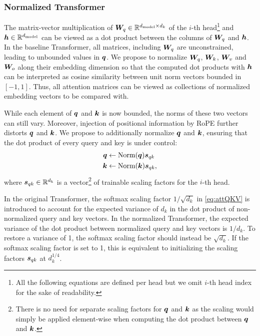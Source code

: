 \documentclass{article} %
\begin{document}
\subsubsection{Normalized Transformer}

The matrix-vector multiplication of ${\bm{W}}_{q}\in \mathbb{R}^{  d_{\text{model}} \times d_k}$ of the $i$-th head\footnote{All the following equations are defined per head but we omit $i$-th head index for the sake of readability.}  and ${\bm{h}}\in \mathbb{R}^{d_{\text{model}}}$ can be viewed as a dot product between the columns of ${\bm{W}}_{q}$ and ${\bm{h}}$. %
In the baseline Transformer, all matrices, including  ${\bm{W}}_{q}$ are unconstrained, leading to unbounded values in ${\bm{q}}$. We propose to normalize ${\bm{W}}_{q}$, ${\bm{W}}_{k}$, ${\bm{W}}_{v}$ and ${\bm{W}}_{o}$ along their embedding dimension so that the computed dot products with ${\bm{h}}$ can be interpreted as cosine similarity between unit norm vectors bounded in $[-1,1]$. Thus, all attention matrices can be viewed as collections of normalized embedding vectors to be compared with. 

While each element of ${\bm{q}}$ and ${\bm{k}}$ is now bounded, the norms of these two vectors can still vary. Moreover,  injection of positional information by RoPE further distorts ${\bm{q}}$ and ${\bm{k}}$. We propose to additionally normalize ${\bm{q}}$ and ${\bm{k}}$, ensuring that the dot product of every query and key is under control: 
\begin{align}
    {\bm{q}} &\leftarrow \text{Norm}({\bm{q}}) {\bm{s}}_{qk}  \label{eq:qkscaling1} \\ 
    {\bm{k}} &\leftarrow \text{Norm}({\bm{k}}) {\bm{s}}_{qk}, \label{eq:qkscaling2}
\end{align}
where ${\bm{s}}_{qk}\in \mathbb{R}^{d_{\text{k}}}$ is a vector\footnote{There is no need for separate scaling factors for ${\bm{q}}$ and ${\bm{k}}$ as the scaling would simply be applied element-wise when computing the dot product between  ${\bm{q}}$ and ${\bm{k}}$.}  of trainable scaling factors for the $i$-th head. 

In the original Transformer, the softmax scaling factor $1/\sqrt{d_k}$ in \eqref{eq:attQKV} is introduced to account for the expected variance  of $d_k$ in the dot product of non-normalized query and key vectors. In the normalized Transformer, the expected variance of the dot product between normalized query and key vectors is $1/d_k$. To restore a variance of 1, the softmax scaling factor should instead be  $\sqrt{d_k}$. If the softmax scaling factor is set to 1, this is equivalent to initializing the scaling factors ${\bm{s}}_{qk}$ at $d^{1/4}_k$. 
\end{document}
